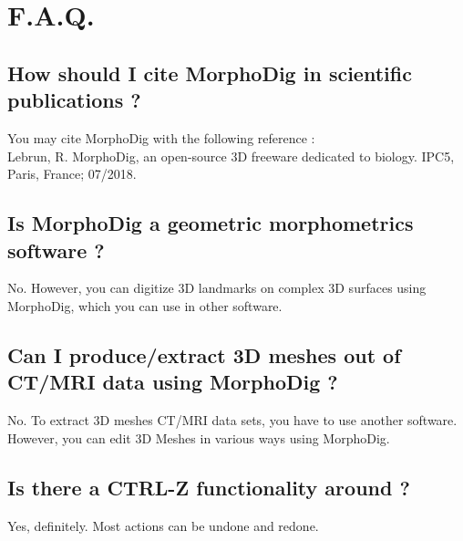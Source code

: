 
 \chapter{F.A.Q.}
		\minitoc  
    \section{How should I cite MorphoDig in scientific publications ?}
    You may  cite MorphoDig with the following reference :\\
		Lebrun, R. MorphoDig, an open-source 3D freeware dedicated to biology. IPC5, Paris, France; 07/2018.
    \section{Is MorphoDig a geometric morphometrics software ?}
    No. However, you can digitize 3D landmarks on complex 3D surfaces using MorphoDig, which you 
		can use in other software.
		\section{Can I produce/extract 3D meshes out of CT/MRI data using MorphoDig ?}
		No. To extract 3D meshes CT/MRI data sets, you have to use another software. However, you can edit 
		3D Meshes in various ways using MorphoDig.
		\section{Is there a CTRL-Z functionality around ?}
		Yes, definitely. Most actions can be undone and redone. 